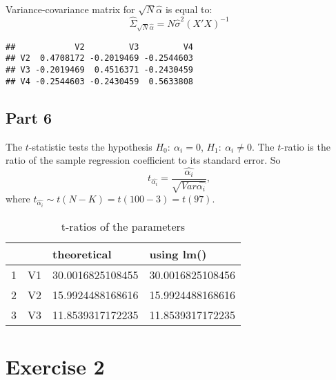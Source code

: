 \documentclass[12pt, a4paper]{article}\usepackage[]{graphicx}\usepackage[]{color}
\makeatletter
\newenvironment{kframe}{%
 \def\at@end@of@kframe{}%
 \ifinner\ifhmode%
  \def\at@end@of@kframe{\end{minipage}}%
  \begin{minipage}{\columnwidth}%
 \fi\fi%
 \def\FrameCommand##1{\hskip\@totalleftmargin \hskip-\fboxsep
 \colorbox{shadecolor}{##1}\hskip-\fboxsep
     \hskip-\linewidth \hskip-\@totalleftmargin \hskip\columnwidth}%
 \MakeFramed {\advance\hsize-\width
   \@totalleftmargin\z@ \linewidth\hsize
   \@setminipage}}%
 {\par\unskip\endMakeFramed%
 \at@end@of@kframe}
\newenvironment{knitrout}{}{} %
\makeatother
\begin{document}
Variance-covariance matrix for $\sqrt{N}\hat{\alpha}$ is equal to:
\[ \hat{\Sigma}_{\sqrt{N}\hat{\alpha}} = N\hat{\sigma}^2 (X'X)^{-1}\]
\begin{knitrout}
\color{fgcolor}\begin{kframe}
\begin{verbatim}
##            V2         V3         V4
## V2  0.4708172 -0.2019469 -0.2544603
## V3 -0.2019469  0.4516371 -0.2430459
## V4 -0.2544603 -0.2430459  0.5633808
\end{verbatim}
\end{kframe}
\end{knitrout}



\subsection{Part 6}
The $t$-statistic tests the hypothesis $H_0:\ \alpha_i = 0$, $H_1:\ \alpha_i \neq 0$. The $t$-ratio is the ratio of the sample regression coefficient to its standard error. So
\[ t_{\hat{\alpha_i}} = \frac{\hat{\alpha_i}}{\sqrt{Var\hat{\alpha_i}}}, \]
where $t_{\hat{\alpha_i}} \sim t(N-K) = t(100-3) = t(97)$.

\begin{table}[H]
\centering
\begin{tabular}{rlll}
  \hline
 &   & theoretical & using lm() \\ 
  \hline
1 & V1 & 30.0016825108455 & 30.0016825108456 \\ 
  2 & V2 & 15.9924488168616 & 15.9924488168616 \\ 
  3 & V3 & 11.8539317172235 & 11.8539317172235 \\ 
   \hline
\end{tabular}
\caption{t-ratios of the parameters} 
\label{tab:table2}
\end{table}








\section{Exercise 2}
\end{document}
